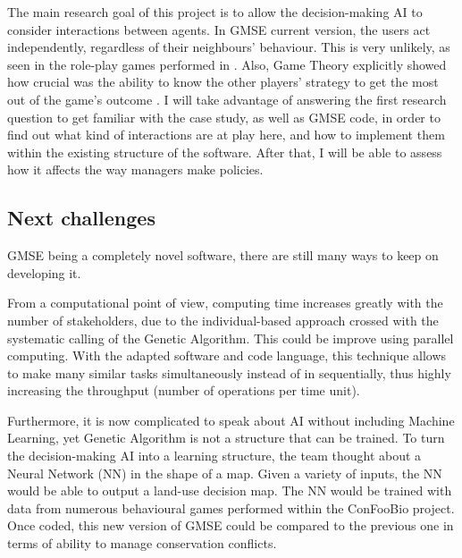 \documentclass[12pt,a4paper]{article}
\begin{document}
The main research goal of this project is to allow the decision-making AI to consider interactions between agents.
In GMSE current version, the users act independently, regardless of their neighbours' behaviour.
This is very unlikely, as seen in the role-play games performed in \cite{redpath2018games}.
Also, Game Theory explicitly showed how crucial was the ability to know the other players' strategy to get the most out of the game's outcome \citep{hilbe2018evolution}.
I will take advantage of answering the first research question to get familiar with the case study, as well as GMSE code, in order to find out what kind of interactions are at play here, and how to implement them within the existing structure of the software.
After that, I will be able to assess how it affects the way managers make policies.

\subsection{Next challenges}

GMSE being a completely novel software, there are still many ways to keep on developing it.

From a computational point of view, computing time increases greatly with the number of stakeholders, due to the individual-based approach crossed with the systematic calling of the Genetic Algorithm.
This could be improve using parallel computing.
With the adapted software and code language, this technique allows to make many similar tasks simultaneously instead of in sequentially, thus highly increasing the throughput (number of operations per time unit).

Furthermore, it is now complicated to speak about AI without including Machine Learning, yet Genetic Algorithm is not a structure that can be trained.
To turn the decision-making AI into a learning structure, the team thought about a Neural Network (NN) in the shape of a map.
Given a variety of inputs, the NN would be able to output a land-use decision map.
The NN would be trained with data from numerous behavioural games performed within the ConFooBio project.
Once coded, this new version of GMSE could be compared to the previous one in terms of ability to manage conservation conflicts.
%

\newpage

\nocite{*}
\end{document}
